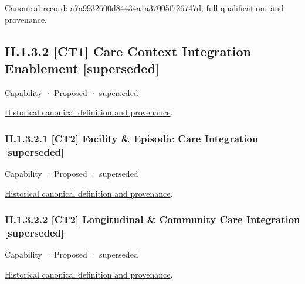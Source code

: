 {\footnotesize \href{../../../../../../../continuum/strategy/capability/feature/a7a9932600d84434a1a37005f726747d.md}{Canonical record: a7a9932600d84434a1a37005f726747d}; full qualifications and provenance.}\par
\subsection*{II.1.3.2 [CT1] Care Context Integration Enablement [superseded]}
\label{navigation:II.1.3.2}

\label{element:a84a7e96e7874a4b87d18c53b1b5cf29}
{\small Capability · Proposed · superseded}\par
\href{../../../../../../../continuum/strategy/capability/a84a7e96e7874a4b87d18c53b1b5cf29.md}{Historical canonical definition and provenance}.\par
\subsubsection*{II.1.3.2.1 [CT2] Facility \& Episodic Care Integration [superseded]}
\label{navigation:II.1.3.2.1}

\label{element:c1eb24ed7e36417cb426288ff57512c0}
{\small Capability · Proposed · superseded}\par
\href{../../../../../../../continuum/strategy/capability/c1eb24ed7e36417cb426288ff57512c0.md}{Historical canonical definition and provenance}.\par
\subsubsection*{II.1.3.2.2 [CT2] Longitudinal \& Community Care Integration [superseded]}
\label{navigation:II.1.3.2.2}

\label{element:8430d50adc504ecc959f15b7cbbcd095}
{\small Capability · Proposed · superseded}\par
\href{../../../../../../../continuum/strategy/capability/8430d50adc504ecc959f15b7cbbcd095.md}{Historical canonical definition and provenance}.\par
